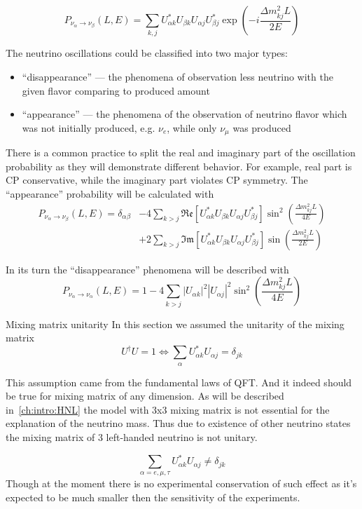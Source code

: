 \documentclass[../main.tex]{subfiles}
\begin{document}
\begin{equation}
P_{\nu_\alpha\to\nu_\beta}(L, E)=\sum_{k, j}U^*_{\alpha k}U_{\beta k}U_{\alpha j}U^*_{\beta j}\exp\left(-i\frac{\Delta m^2_{kj}L}{2E}\right)
\end{equation}

The neutrino oscillations could be classified into two major types:
\begin{itemize}
  \item ``disappearance'' --- the phenomena of observation less neutrino with the given flavor comparing to produced amount
  \item ``appearance'' --- the phenomena of the observation of neutrino flavor which was not initially produced, e.g. $\nu_e$, while only $\nu_\mu$ was produced
\end{itemize}
There is a common practice to split the real and imaginary part of the oscillation probability as they will demonstrate different behavior. For example, real part is CP conservative, while the imaginary part violates CP symmetry. The ``appearance'' probability will be calculated with
\begin{align}
\nonumber
P_{\nu_\alpha\to\nu_\beta}(L, E)=\delta_{\alpha\beta}&-4\sum_{k>j}\mathfrak{Re}\left[U^*_{\alpha k}U_{\beta k}U_{\alpha j}U^*_{\beta j}\right]\sin^2\left(\frac{\Delta m^2_{kj}L}{4E}\right) \\
&+2\sum_{k>j}\mathfrak{Im}\left[U^*_{\alpha k}U_{\beta k}U_{\alpha j}U^*_{\beta j}\right]\sin\left(\frac{\Delta m^2_{kj}L}{2E}\right)
\label{eq:intro:app}
\end{align}

In its turn the ``disappearance'' phenomena will be described with
\begin{equation}
\label{eq:intro:dis}
P_{\nu_\alpha\to\nu_\alpha}(L, E)=1-4\sum_{k>j}\left|U_{\alpha k}\right|^2\left|U_{\alpha j}\right|^2\sin^2\left(\frac{\Delta m^2_{kj}L}{4E}\right)
\end{equation}

\begin{bclogo}[couleur=blue!2, arrondi=0.1, logo=\bcinfo, nobreak=true]{Mixing matrix unitarity}
In this section we assumed the unitarity of the mixing matrix
\begin{equation}
U^\dag U=1 \Longleftrightarrow\sum_\alpha U^*_{\alpha k}U_{\alpha j}=\delta_{jk}
\end{equation}

This assumption came from the fundamental laws of QFT. And it indeed should be true for mixing matrix of any dimension. As will be described in~\autoref{ch:intro:HNL} the model with 3x3 mixing matrix is not essential for the explanation of the neutrino mass. Thus due to existence of other neutrino states the mixing matrix of 3 left-handed neutrino is not unitary.

\begin{equation}
\sum_{\alpha=e, \mu, \tau} U^*_{\alpha k}U_{\alpha j}\neq\delta_{jk}
\end{equation}
Though at the moment there is no experimental conservation of such effect as it's expected to be much smaller then the sensitivity of the experiments.
\end{bclogo}
\end{document}
